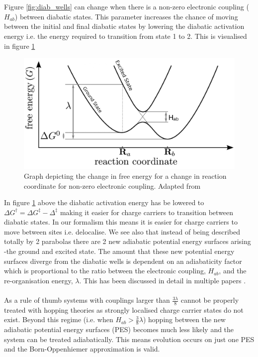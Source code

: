 \\\\
Figure \ref{fig:diab_wells} can change when there is a non-zero electronic coupling ($H_{ab}$) between diabatic states. This parameter increases the chance of moving between the initial and final diabatic states by lowering the diabatic activation energy i.e. the energy required to transition from state 1 to 2. This is visualised in figure \ref{fig:adiab_wells}
\begin{figure}[ht]
  \includegraphics[width=\textwidth]{./img/adiabatic_wells.png}
  \caption{Graph depicting the change in free energy for a change in reaction coordinate for non-zero electronic coupling. Adapted from \cite{oberhofer_charge_2017}}
  \label{fig:adiab_wells}
\end{figure}
In figure \ref{fig:adiab_wells} above the diabatic activation energy has be lowered to $\Delta G^{\dagger} = \Delta G^{\ddagger} - \Delta^{\ddagger}$ making it easier for charge carriers to transition between diabatic states. In our formalism this means it is easier for charge carriers to move between sites i.e. delocalise. We see also that instead of being described totally by 2 parabolas there are 2 new adiabatic potential energy surfaces arising -the ground and excited state. The amount that these new potential energy surfaces diverge from the diabatic wells is dependent on an adiabaticity factor which is proportional to the ratio between the electronic coupling, $H_{ab}$, and the re-organisation energy, $\lambda$. This has been discussed in detail in multiple papers \cite{oberhofer_charge_2017, spencer_fob-sh:_2016, spencer_confronting_2016,   Gajdos2013Mar} .
\\\\
As a rule of thumb systems with couplings larger than $\frac{3 \lambda}{8}$ cannot be properly treated with hopping theories \cite{Gajdos2013Mar} as strongly localised charge carrier states do not exist. Beyond this regime (i.e. when $H_{ab} > \frac{3}{8} \lambda$) hopping between the new adiabatic potential energy surfaces (PES) becomes much less likely and the system can be treated adiabatically. This means evolution occurs on just one PES and the Born-Oppenhiemer approximation is valid.
\\\\\\\\



